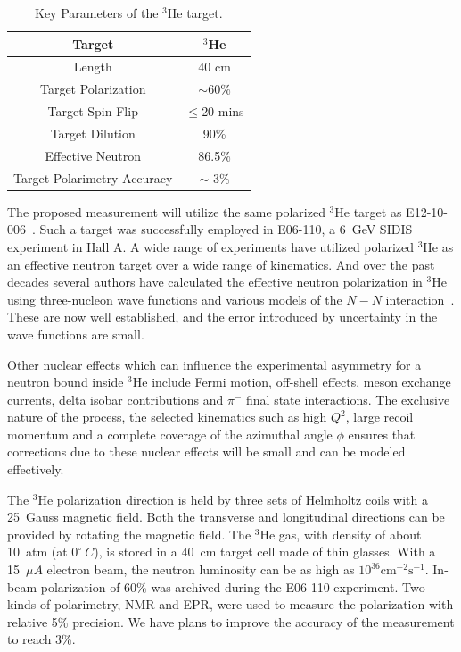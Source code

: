 \begin{table}[!ht]
\centering
\begin{tabular}{|c|c|}
\hline
Target                       & $^3$He              \\\hline 
Length                       & 40 cm               \\\hline          
Target Polarization          & $\sim$60\%          \\\hline 
Target Spin Flip             & $\leq$20 mins       \\\hline 
Target Dilution              & 90\%                \\\hline
Effective Neutron            & 86.5\%              \\\hline
Target Polarimetry Accuracy  & $\sim$ 3\%          \\\hline
\end{tabular}
\caption{\footnotesize{Key Parameters of the $\mathrm{^{3}He}$
    target.}\label{table:target}}
\end{table} 
The proposed measurement will utilize the same polarized $\mathrm{^{3}He}$
target as E12-10-006~\cite{solid:e12-10-006}. Such a target was successfully
employed in E06-110, a 6~GeV SIDIS experiment in Hall A.  A wide range of
experiments have utilized polarized $^3$He as an effective neutron target over
a wide range of kinematics. And over the past decades several authors have
calculated the effective neutron polarization in $^3$He using three-nucleon
wave functions and various models of the $N-N$ interaction~\cite{3hepol1}.
These are now well established, and the error introduced by uncertainty in the
wave functions are small.

Other nuclear effects which can influence the experimental asymmetry for a
neutron bound inside $^3$He include Fermi motion, off-shell effects, meson
exchange currents, delta isobar contributions and $\pi^-$ final state
interactions. The exclusive nature of the process, the selected kinematics such
as high $Q^2$, large recoil momentum and a complete coverage of the azimuthal
angle $\phi$ ensures that corrections due to these nuclear effects will be
small and can be modeled effectively.

The $\mathrm{^{3}He}$ polarization direction is held by three sets of Helmholtz
coils with a 25~Gauss magnetic field. Both the transverse and longitudinal
directions can be provided by rotating the magnetic field. The
$\mathrm{^{3}He}$ gas, with density of about 10~atm (at $0^{\circ}~C$), is stored
in a 40~cm target cell made of thin glasses. With a 15~$\mu A$ electron beam,
the neutron luminosity can be as high as $\mathrm{10^{36} cm^{-2}s^{-1}}$. In-beam
polarization of 60\% was archived during the E06-110 experiment. Two kinds of
polarimetry, NMR and EPR, were used to measure the polarization with relative
5\% precision. We have plans to improve the accuracy of the measurement to
reach 3\%.

